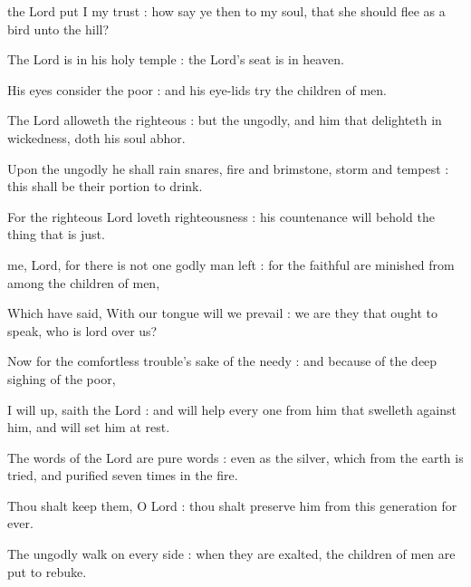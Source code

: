 
 the Lord put I my trust : how say ye then to my soul, that she should flee as a bird unto the hill?\par
{}
The Lord is in his holy temple : the Lord's seat is in heaven.\par
{}His eyes consider the poor : and his eye-lids try the children of men.\par
{}The Lord alloweth the righteous : but the ungodly, and him that delighteth in wickedness, doth his soul abhor.\par
{}Upon the ungodly he shall rain snares, fire and brimstone, storm and tempest : this shall be their portion to drink.\par
{}For the righteous Lord loveth righteousness : his countenance will behold the thing that is just.\par



 me, Lord, for there is not one godly man left : for the faithful are minished from among the children of men,\par
{}
Which have said, With our tongue will we prevail : we are they that ought to speak, who is lord over us?\par
{}Now for the comfortless trouble's sake of the needy : and because of the deep sighing of the poor,\par
{}I will up, saith the Lord : and will help every one from him that swelleth against him, and will set him at rest.\par
{}The words of the Lord are pure words : even as the silver, which from the earth is tried, and purified seven times in the fire.\par
{}Thou shalt keep them, O Lord : thou shalt preserve him from this generation for ever.\par
{}The ungodly walk on every side : when they are exalted, the children of men are put to rebuke.\par

